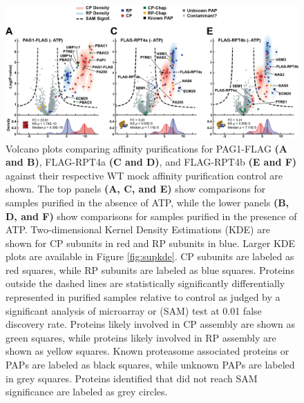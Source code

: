 \begin{figure}
	\centering
	\includegraphics[width=\columnwidth]{Proteasome/Volcanosplit1.png}
	{Volcano plots comparing affinity purifications for PAG1-FLAG \textbf{(A and B)}, FLAG-RPT4a \textbf{(C and D)}, and FLAG-RPT4b \textbf{(E and F)} against their respective WT mock affinity purification control are shown. The top panels \textbf{(A, C, and E)} show comparisons for samples purified in the absence of ATP, while the lower panels \textbf{(B, D, and F)} show comparisons for samples purified in the presence of ATP. Two-dimensional Kernel Density Estimations (KDE) are shown for CP subunits in red and RP subunits in blue. Larger KDE plots are available in Figure \ref{fig:supkde}. CP subunits are labeled as red squares, while RP subunits are labeled as blue squares. Proteins outside the dashed lines are statistically significantly differentially represented in purified samples relative to control as judged by a significant analysis of microarray or (SAM) test at 0.01 false discovery rate. Proteins likely involved in CP assembly are shown as green squares, while proteins likely involved in RP assembly are shown as yellow squares. Known proteasome associated proteins or PAPs are labeled as black squares, while unknown PAPs are labeled in grey squares. Proteins identified that did not reach SAM significance are labeled as grey circles.}
	\label{fig:volcanos1}
\end{figure}

